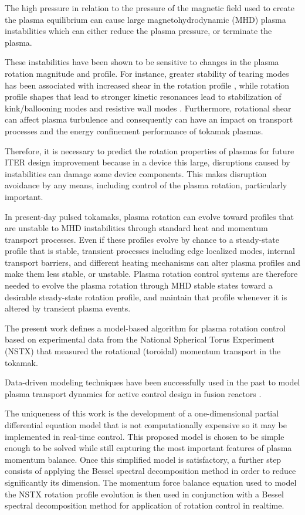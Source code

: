 \documentclass[12pt]{iopart}
\begin{document}
The high pressure in relation to the pressure of the magnetic field used to create the plasma equilibrium can cause large magnetohydrodynamic (MHD) plasma instabilities which can either reduce the plasma pressure, or terminate the plasma. 

These instabilities have been shown to be sensitive to changes in the plasma rotation magnitude and profile. For instance, greater stability of tearing modes has been associated with increased shear in the rotation profile \cite{Gerhardt09, Park13}, while rotation profile shapes that lead to stronger kinetic resonances lead to stabilization of kink/ballooning modes and resistive wall modes \cite{Sabbagh10, Berkery10}. Furthermore, rotational shear can affect plasma turbulence and consequently can have an impact on transport processes and the energy confinement performance of tokamak plasmas.

Therefore, it is necessary to predict the rotation properties of plasmas for future ITER design improvement  because in a device this large, disruptions caused by instabilities can damage some device components. This makes disruption avoidance by any means, including control of the plasma rotation, particularly important. 

In present-day pulsed tokamaks, plasma rotation can evolve toward profiles that are unstable to MHD instabilities through standard heat and momentum transport processes. Even if these profiles evolve by chance to a steady-state profile that is stable, transient processes including edge localized modes, internal transport barriers, and different heating mechanisms can alter plasma profiles and make them less stable, or unstable. Plasma rotation control systems are therefore needed to evolve the plasma rotation through MHD stable states toward a desirable steady-state rotation profile, and maintain that profile whenever it is altered by transient plasma events.

The present work defines a model-based algorithm for plasma rotation control based on experimental data from the National Spherical Torus Experiment (NSTX) \cite{Ono00} that measured the rotational (toroidal) momentum transport in the tokamak.

 Data-driven modeling techniques have been successfully used in the past to model plasma transport dynamics for active control design in fusion reactors \cite{Moreau13, Boyer133, Boyer144}.
 
 The uniqueness of this work is the development of a one-dimensional partial differential equation model that is not computationally expensive so it may be implemented in real-time control.  
 This proposed model is chosen to be simple enough to be solved while still capturing the most important features of plasma momentum balance. Once this simplified model is satisfactory, a further step consists of applying the Bessel spectral decomposition method in order to reduce significantly its dimension. The momentum force balance equation used to model the NSTX rotation profile evolution is then used in conjunction with a Bessel spectral decomposition method for application of rotation control in realtime.
 
\end{document}

